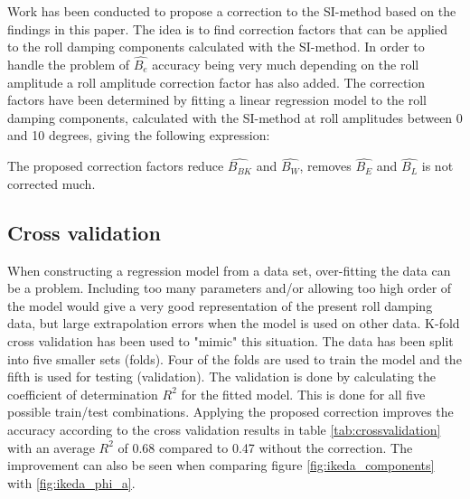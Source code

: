 Work has been conducted to propose a correction to the SI-method based on the findings in this paper. The idea is to find correction factors that can be applied to the roll damping components calculated with the SI-method. In order to handle the problem of $\hat{B_e}$ accuracy being very much depending on the roll amplitude a roll amplitude correction factor has also added. The correction factors have been determined by fitting a linear regression model to the roll damping components, calculated with the SI-method at roll amplitudes between 0 and 10 degrees, giving the following expression: 

The proposed correction factors reduce $\hat{B_{BK}}$ and $\hat{B_{W}}$, removes $\hat{B_{E}}$ and $\hat{B_{L}}$ is not corrected much. 

\subsection{Cross validation}
When constructing a regression model from a data set, over-fitting the data can be a problem. Including too many parameters and/or allowing too high order of the model would give a very good representation of the present roll damping data, but large extrapolation errors when the model is used on other data. K-fold cross validation has been used to "mimic" this situation. The data has been split into five smaller sets (folds). Four of the folds are used to train the model and the fifth is used for testing (validation). The validation is done by calculating the coefficient of determination $R^2$ for the fitted model. This is done for all five possible train/test combinations. Applying the proposed correction improves the accuracy according to the cross validation results in table \ref{tab:crossvalidation} with an average $R^2$ of 0.68 compared to 0.47 without the correction. The improvement can also be seen when comparing figure \ref{fig:ikeda_components} with \ref{fig:ikeda_phi_a}.


